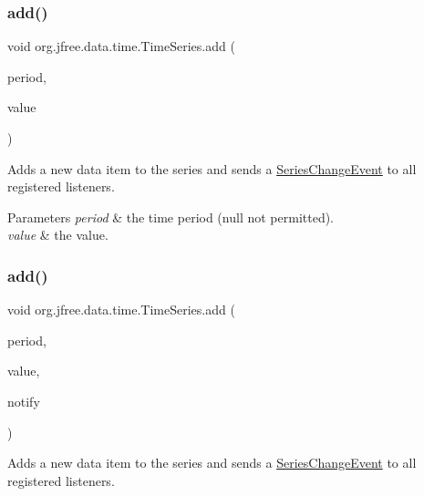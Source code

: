 \subsubsection{\texorpdfstring{add()}{add()}\hspace{0.1cm}{\footnotesize\ttfamily [3/6]}}
{\footnotesize\ttfamily void org.\+jfree.\+data.\+time.\+Time\+Series.\+add (\begin{DoxyParamCaption}\item[{\mbox{\hyperlink{classorg_1_1jfree_1_1data_1_1time_1_1_regular_time_period}{Regular\+Time\+Period}}}]{period,  }\item[{double}]{value }\end{DoxyParamCaption})}

Adds a new data item to the series and sends a \mbox{\hyperlink{}{Series\+Change\+Event}} to all registered listeners.


\begin{DoxyParams}{Parameters}
{\em period} & the time period ({\ttfamily null} not permitted). \\
\hline
{\em value} & the value. \\
\hline
\end{DoxyParams}
\mbox{\label{classorg_1_1jfree_1_1data_1_1time_1_1_time_series_a0ab959354d8fae9668f1808beef2b2d5}} 
\subsubsection{\texorpdfstring{add()}{add()}\hspace{0.1cm}{\footnotesize\ttfamily [4/6]}}
{\footnotesize\ttfamily void org.\+jfree.\+data.\+time.\+Time\+Series.\+add (\begin{DoxyParamCaption}\item[{\mbox{\hyperlink{classorg_1_1jfree_1_1data_1_1time_1_1_regular_time_period}{Regular\+Time\+Period}}}]{period,  }\item[{double}]{value,  }\item[{boolean}]{notify }\end{DoxyParamCaption})}

Adds a new data item to the series and sends a \mbox{\hyperlink{}{Series\+Change\+Event}} to all registered listeners.


